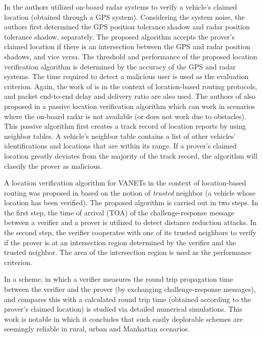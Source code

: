 \documentclass[journal]{IEEEtran}
\begin{document}
In \cite{yan2008providing} the authors utilized on-board radar systems to verify a vehicle's claimed location  (obtained through a GPS system). Considering the system noise, the authors first determined the GPS position tolerance shadow and radar position tolerance shadow, separately.  The proposed algorithm accepts the prover's claimed location if there is an intersection between the GPS and radar position shadows, and vice versa. The threshold and performance of the proposed location verification algorithm is determined by the accuracy of the GPS and radar systems. The time required to detect a malicious user is used as the evaluation criterion. Again, the work of \cite{yan2008providing} is in the context of location-based routing protocols, and packet end-to-end delay and delivery ratio are also used. The authors of \cite{yan2008providing} also proposed in \cite{yan2009providing} a passive location verification algorithm which can work in scenarios where the on-board radar is not available (or does not work due to obstacles). This passive algorithm first creates a track record of location reports by using neighbor tables. A vehicle's neighbor table contains a list of other vehicles' identifications and locations that are within its range. If a prover's claimed location greatly deviates from the majority of the track record, the algorithm will classify the prover as malicious.

A location verification algorithm for VANETs in the context of location-based routing was proposed in \cite{xue2010trusted} based on the notion of \emph{trusted} neighbor (a vehicle whose location has been verified). The proposed algorithm is carried out in two steps. In the first step, the time of arrival (TOA) of the challenge-response message between a verifier and a prover is utilized to detect distance reduction attacks. In the second step, the verifier cooperates with one of its trusted neighbors to verify if the prover is at an intersection region determined by the verifier and the trusted neighbor. The area of the intersection region is used as the performance criterion.


In \cite{weer2011verifying} a scheme, in which a verifier  measures the round trip propagation time between the verifier and the prover (by exchanging challenge-response messages), and  compares this  with a calculated round trip time (obtained according to the prover's claimed location) is studied via detailed numerical simulations. This work is notable in which it concludes that such easily deplorable schemes are seemingly reliable in rural, urban and Manhattan scenarios.
\end{document}
